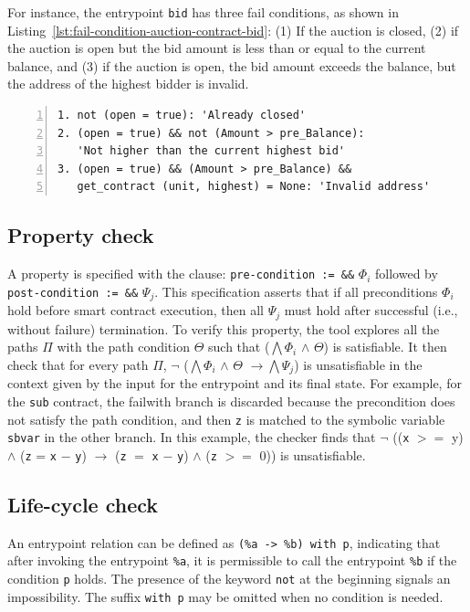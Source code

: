 \documentclass[runningheads]{llncs}
\begin{document}
For instance, the entrypoint \lstinline|bid| has three fail conditions, as shown in Listing~\ref{lst:fail-condition-auction-contract-bid}: (1) If the auction is closed, (2) if the auction is open but the bid amount is less than or equal to the current balance, and (3) if the auction is open, the bid amount exceeds the balance, but the address of the highest bidder is invalid.
\begin{lstlisting}[float=tp,captionpos=b,caption={Fail condition for auction contract bid entrypoint},label={lst:fail-condition-auction-contract-bid},numbers=left]
1. not (open = true): 'Already closed'
2. (open = true) && not (Amount > pre_Balance):
   'Not higher than the current highest bid'
3. (open = true) && (Amount > pre_Balance) && 
   get_contract (unit, highest) = None: 'Invalid address' 
\end{lstlisting}
\subsection{Property check}
\label{sec:property-check}
A property is
specified with the clause:  \lstinline/pre-condition := &&/
$\Phi_{i}$ followed by \lstinline/post-condition := &&/ $\Psi_{j}$. This
specification asserts that if all preconditions $\Phi_{i}$ hold before
smart contract execution, then all $\Psi_{j}$ must hold after
successful (i.e., without failure) termination. To verify this
property, the tool explores all the paths $\Pi$ 
with the path condition $\Theta$ such that ($\bigwedge \Phi_{i}$
$\land$ $\Theta$) is satisfiable. It then check that for every path
$\Pi$, $\neg$ ($\bigwedge \Phi_{i}$ $\land$ $\Theta$ $\rightarrow \bigwedge \Psi_{j}$) is unsatisfiable in the context given by the input for the entrypoint
and its final state. For example, for the \lstinline/sub/ contract, the failwith branch is discarded because the precondition does not satisfy the path condition, and then \lstinline/z/ is matched to
the symbolic variable \lstinline/sbvar/ in the other branch. In this
example, the checker finds that $\neg$ ((\lstinline/x/ $>=$ y) $\land$ (\lstinline/z/
= \lstinline/x/ $-$ \lstinline/y/) $\rightarrow$ (\lstinline/z/ $=$ \lstinline/x/ $-$ \lstinline/y/) $\land$ (\lstinline/z/ $>=$ 0)) is unsatisfiable.
\subsection{Life-cycle check}
\label{sec:life-cycle-check}
An entrypoint relation can be defined as \lstinline/(%a -> %b) with
p/, indicating that after invoking the entrypoint \lstinline/%a/, it
is permissible to call the entrypoint \lstinline/%b/ if the condition
\lstinline/p/ holds. The presence of the keyword \lstinline/not/ at
the beginning signals an impossibility. The suffix \lstinline/with p/ may be omitted when no condition is needed.
\end{document}
